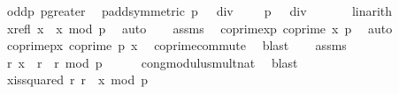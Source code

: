 \begin{isabellebody}
\ odd{\isacharunderscore}{\kern0pt}p\ p{\isacharunderscore}{\kern0pt}greater{\isacharunderscore}{\kern0pt}{}\ \isamarkupfalse%
\ p{\isacharunderscore}{\kern0pt}add{\isacharunderscore}{\kern0pt}{}{\isacharbrackleft}{\kern0pt}symmetric{\isacharbrackright}{\kern0pt}{\isacharcolon}{\kern0pt}\ {\isachardoublequoteopen}{\isacharparenleft}{\kern0pt}p\ {\isacharplus}{\kern0pt}\ {}{\isacharparenright}{\kern0pt}\ div\ {}\ {\isacharequal}{\kern0pt}\ {}\ {\isacharplus}{\kern0pt}\ {\isacharparenleft}{\kern0pt}p\ {\isacharminus}{\kern0pt}\ {}{\isacharparenright}{\kern0pt}\ div\ {}{\isachardoublequoteclose}\ \isanewline
\ \ \ \isamarkupfalse%
\ linarith\isanewline
\ \ \isamarkupfalse%
\ x{\isacharunderscore}{\kern0pt}refl{\isacharcolon}{\kern0pt}\ {\isachardoublequoteopen}{\isacharbrackleft}{\kern0pt}x\ {\isacharequal}{\kern0pt}\ x{\isacharbrackright}{\kern0pt}\ {\isacharparenleft}{\kern0pt}mod\ p{\isacharparenright}{\kern0pt}{\isachardoublequoteclose}\ \isamarkupfalse%
\ auto\isanewline
\isanewline
\ \ \isamarkupfalse%
\ assms{\isacharparenleft}{\kern0pt}{}{\isacharparenright}{\kern0pt}\ \isamarkupfalse%
\ coprime{\isacharunderscore}{\kern0pt}xp{\isacharcolon}{\kern0pt}\ {\isachardoublequoteopen}coprime\ x\ p{\isachardoublequoteclose}\ \isamarkupfalse%
\ auto\isanewline
\ \ \isamarkupfalse%
\ \isamarkupfalse%
\ coprime{\isacharunderscore}{\kern0pt}p{\isacharunderscore}{\kern0pt}x{\isacharcolon}{\kern0pt}\ {\isachardoublequoteopen}coprime\ p\ x{\isachardoublequoteclose}\ \isamarkupfalse%
\ coprime{\isacharunderscore}{\kern0pt}commute\ \isamarkupfalse%
\ blast\isanewline
\ \ \isamarkupfalse%
\ assms{\isacharparenleft}{\kern0pt}{}{\isacharparenright}{\kern0pt}\ \isamarkupfalse%
\ {\isachardoublequoteopen}{\isasymexists}r{\isachardot}{\kern0pt}\ {\isacharbrackleft}{\kern0pt}x\ {\isacharequal}{\kern0pt}\ r\ {\isacharasterisk}{\kern0pt}\ r{\isacharbrackright}{\kern0pt}\ {\isacharparenleft}{\kern0pt}mod\ p{\isacharparenright}{\kern0pt}{\isachardoublequoteclose}\isanewline
\ \ \ \ \isamarkupfalse%
\ cong{\isacharunderscore}{\kern0pt}modulus{\isacharunderscore}{\kern0pt}mult{\isacharunderscore}{\kern0pt}nat\ \isamarkupfalse%
\ blast\isanewline
\ \ \isamarkupfalse%
\ \isamarkupfalse%
\ x{\isacharunderscore}{\kern0pt}is{\isacharunderscore}{\kern0pt}squared{\isacharcolon}{\kern0pt}\ {\isachardoublequoteopen}{\isasymexists}r{\isachardot}{\kern0pt}\ {\isacharbrackleft}{\kern0pt}r{\isacharcircum}{\kern0pt}{}\ {\isacharequal}{\kern0pt}\ x{\isacharbrackright}{\kern0pt}\ {\isacharparenleft}{\kern0pt}mod\ p{\isacharparenright}{\kern0pt}{\isachardoublequoteclose}\ \isanewline

\end{isabellebody}
